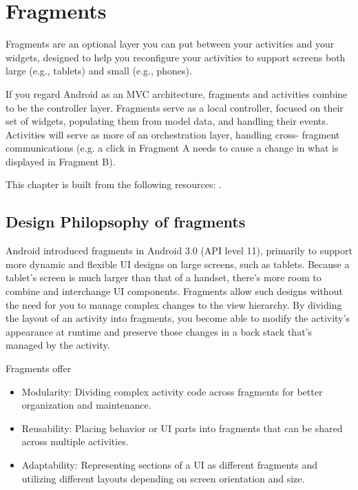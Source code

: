 
\chapter{Fragments}
Fragments are an optional layer you can put between your activities and your widgets, designed to help you reconfigure your activities to support screens both large (e.g., tablets) and small (e.g., phones). 

If you regard Android as an MVC architecture, fragments and activities combine to be the controller layer. Fragments serve as a local controller, focused on their set of widgets, populating them from model data, and handling
their events. Activities will serve as more of an orchestration layer, handling cross- fragment communications (e.g. a click in Fragment A needs to cause a change in what is displayed in Fragment B).

This chapter is built from the following resources: \cite{Point2017, TueDao2017, Guide2017, murphymarkl.2017,Gleason2017}.

\section{Design Philopsophy of fragments}
Android introduced fragments in Android 3.0 (API level 11), primarily to support more dynamic and flexible UI designs on large screens, such as tablets. Because a tablet's screen is much larger than that of a handset, there's more room to combine and interchange UI components. Fragments allow such designs without the need for you to manage complex changes to the view hierarchy. By dividing the layout of an activity into fragments, you become able to modify the activity's appearance at runtime and preserve those changes in a back stack that's managed by the activity.

Fragments offer

\begin{itemize}
	\item Modularity: Dividing complex activity code across fragments for better organization and maintenance.
	\item Reusability: Placing behavior or UI parts into fragments that can be shared across multiple activities.
	\item Adaptability: Representing sections of a UI as different fragments and utilizing different layouts depending on screen orientation and size.
\end{itemize}

